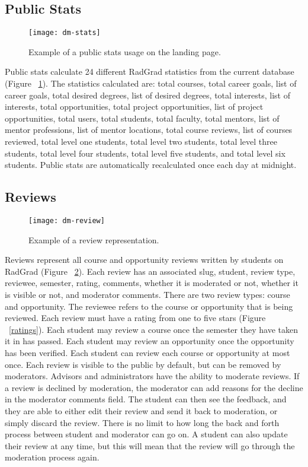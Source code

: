 \subsection{Public Stats}
\begin{figure}[htbp!]
\centering
\texttt{[image: dm-stats]}
\caption{Example of a public stats usage on the landing page.}
\label{public-stats}
\end{figure}
Public stats calculate 24 different RadGrad statistics from the current database (Figure ~\ref{public-stats}). The statistics calculated are: total courses, total career goals, list of career goals, total desired degrees, list of desired degrees, total interests, list of interests, total opportunities, total project opportunities, list of project opportunities, total users, total students, total faculty, total mentors, list of mentor professions, list of mentor locations, total course reviews, list of courses reviewed, total level one students, total level two students, total level three students, total level four students, total level five students, and total level six students. Public stats are automatically recalculated once each day at midnight. 

\subsection{Reviews}
\begin{figure}[htbp!]
\centering
\texttt{[image: dm-review]}
\caption{Example of a review representation.}
\label{review}
\end{figure}
Reviews represent all course and opportunity reviews written by students on RadGrad (Figure ~\ref{review}). Each review has an associated slug, student, review type, reviewee, semester, rating, comments, whether it is moderated or not, whether it is visible or not, and moderator comments. There are two review types: course and opportunity. The reviewee refers to the course or opportunity that is being reviewed. Each review must have a rating from one to five stars (Figure ~\ref{ratings}). Each student may review a course once the semester they have taken it in has passed. Each student may review an opportunity once the opportunity has been verified. Each student can review each course or opportunity at most once. Each review is visible to the public by default, but can be removed by moderators. Advisors and administrators have the ability to moderate reviews. If a review is declined by moderation, the moderator can add reasons for the decline in the moderator comments field. The student can then see the feedback, and they are able to either edit their review and send it back to moderation, or simply discard the review. There is no limit to how long the back and forth process between student and moderator can go on. A student can also update their review at any time, but this will mean that the review will go through the moderation process again.

